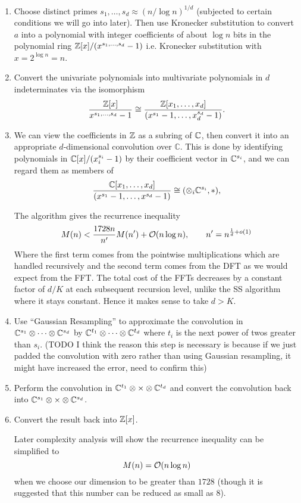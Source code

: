 \begin{enumerate}
    \item  Choose distinct primes $s_1, \ldots, s_d \approx (n / \log n)^{1/d}$ (subjected to certain conditions we will go into later). Then use Kronecker substitution to convert $a$ into a polynomial with integer coefficients of about $\log n$ bits in the polynomial ring ${\mathbb Z}[x]/ (x^{s_1, \ldots, s_d} - 1)$ i.e. Kronecker substitution with $x = 2^{\log n} = n$.

    \item Convert the univariate polynomials into multivariate polynomials in $d$ indeterminates via the isomorphism
    \[
        \frac{{\mathbb Z}[x]}{x^{s_1, \ldots, s_d} - 1} \cong \frac{{\mathbb Z}[x_1, \ldots, x_d]}{(x^{s_1} - 1, \ldots, x_d^{s_d} - 1)}.
    \]
    \item We can view the coefficients in ${\mathbb Z}$ as a subring of ${\mathbb C}$, then convert it into an appropriate $d$-dimensional convolution over $\mathbb{C}$.
This is done by identifying polynomials in ${\mathbb C}[x]/(x_i^{s_i} - 1)$ by their coefficient vector in ${\mathbb C}^{s_i}$, and we can regard them as members of
    \[
        \frac{{\mathbb C}[x_1, \ldots, x_d]}{(x^{s_1} - 1, \ldots, x^{s_d} - 1)} \cong (\otimes_i {\mathbb C}^{s_i}, \ast),
    \]

    The algorithm gives the recurrence inequality
    \[
        M(n) < \frac{1728n}{n^\prime}M(n^\prime) + \mathcal O(n \log n), \qquad n^\prime = n^{\frac{1}{d} + o(1)}
    \]
    Where the first term comes from the pointwise multiplications which are handled recursively and the second term comes from the DFT as we would expect from the FFT. The total cost of the FFTs decreases by a constant factor of $d/K$ at each subsequent recursion level, unlike the SS algorithm where it stays constant. Hence it makes sense to take $d > K$.

\item Use ``Gaussian Resampling'' to approximate the convolution in ${\mathbb C}^{s_1} \otimes \cdots \otimes {\mathbb C}^{s_d}$ by ${\mathbb C}^{t_1} \otimes \cdots \otimes {\mathbb C}^{t_d}$ where $t_i$ is the next power of twos greater than $s_i$. (TODO I think the reason this step is necessary is because if we just padded the convolution with zero rather than using Gaussian resampling, it might have increased the error, need to confirm this)
    \item Perform the convolution in ${\mathbb C}^{t_1} \otimes \times \otimes {\mathbb C}^{t_d}$ and convert the convolution back into ${\mathbb C}^{s_1} \otimes \times \otimes {\mathbb C}^{s_d}$. 
    \item Convert the result back into ${\mathbb Z}[x]$.

    Later complexity analysis will show the recurrence inequality can be simplified to
    \[
    M(n) = \mathcal O(n \log n)
    \]
    when we choose our dimension to be greater than $1728$ (though it is suggested that this number can be reduced as small as $8$).
\end{enumerate}

